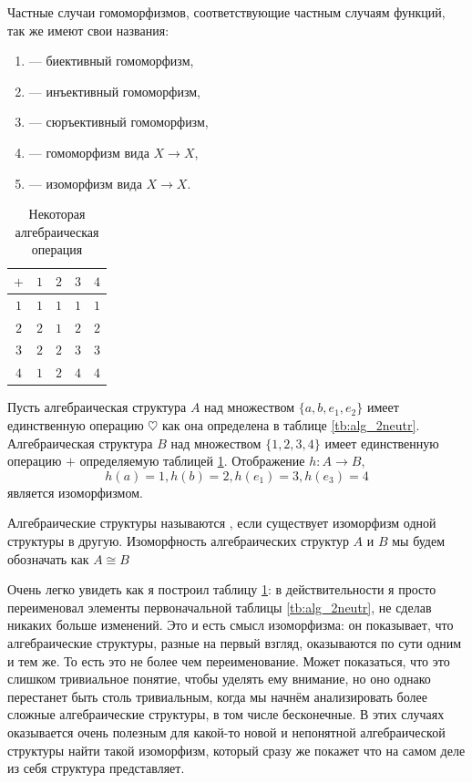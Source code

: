 \begin{definition}
	Частные случаи гомоморфизмов, соответствующие частным случаям функций, так же имеют свои названия:
\begin{enumerate}
	\item {} — биективный гомоморфизм,
	\item {} — инъективный гомоморфизм,
	\item {} — сюръективный гомоморфизм,
	\item {} — гомоморфизм вида $X\to X$,
	\item {} — изоморфизм вида $X\to X$.
\end{enumerate}
\end{definition}

\begin{table}[h]\label{tb:alg_2neutriso}
	\centering
	\begin{tabular}{c|cccc}
		$+$ & $1$ & $2$ & $3$ & $4$ \\
		\hline
		$1$ & $1$ & $1$ & $1$ & $1$ \\
		$2$ & $2$ & $1$ & $2$ & $2$ \\
		$3$ & $2$ & $2$ & $3$ & $3$ \\
		$4$ & $1$ & $2$ & $4$ & $4$
	\end{tabular}
	\caption{Некоторая алгебраическая операция}
\end{table}

\begin{example}
  Пусть алгебраическая структура $A$ над множеством $\{a, b, e_1, e_2\}$ имеет единственную операцию $\heartsuit$ как она определена в таблице \ref{tb:alg_2neutr}. Алгебраическая структура $B$ над множеством $\{1, 2, 3, 4\}$ имеет единственную операцию $+$ определяемую таблицей \ref{tb:alg_2neutriso}. Отображение $h:A\to B$,
  \[
  h(a) = 1, h(b) =2, h(e_1) = 3, h(e_3) = 4
  \]
  является изоморфизмом.
\end{example}

\begin{definition}
	Алгебраические структуры называются , если существует изоморфизм одной структуры в другую. Изоморфность алгебраических структур $A$ и $B$ мы будем обозначать как $A\cong B$
\end{definition}

Очень легко увидеть как я построил таблицу \ref{tb:alg_2neutriso}: в действительности я просто переименовал элементы первоначальной таблицы \ref{tb:alg_2neutr}, не сделав никаких больше изменений. Это и есть смысл изоморфизма: он показывает, что алгебраические структуры, разные на первый взгляд, оказываются по сути одним и тем же. То есть это не более чем переименование. Может показаться, что это слишком тривиальное понятие, чтобы уделять ему внимание, но оно однако перестанет быть столь тривиальным, когда мы начнём анализировать более сложные алгебраические структуры, в том числе бесконечные. В этих случаях оказывается очень полезным для какой-то новой и непонятной алгебраической структуры найти такой изоморфизм, который сразу же покажет что на самом деле из себя структура представляет.

